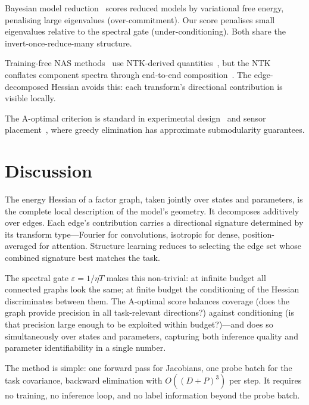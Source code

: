 \documentclass[11pt, a4paper]{article}
\begin{document}
Bayesian model reduction~\citep{friston2018bmr,friston2016group} scores reduced models by variational free energy, penalising large eigenvalues (over-commitment).
Our score penalises small eigenvalues relative to the spectral gate (under-conditioning).
Both share the invert-once-reduce-many structure.

Training-free NAS methods~\citep{chen2021tenas,shu2022nasi} use NTK-derived quantities~\citep{jacot2018neural}, but the NTK conflates component spectra through end-to-end composition~\citep{mok2022demystifying,zhou2024vintk}.
The edge-decomposed Hessian avoids this: each transform's directional contribution is visible locally.

The A-optimal criterion is standard in experimental design~\citep{pukelsheim2006optimal} and sensor placement~\citep{krause2008near}, where greedy elimination has approximate submodularity guarantees.

\section{Discussion}

The energy Hessian of a factor graph, taken jointly over states and parameters, is the complete local description of the model's geometry.
It decomposes additively over edges.
Each edge's contribution carries a directional signature determined by its transform type---Fourier for convolutions, isotropic for dense, position-averaged for attention.
Structure learning reduces to selecting the edge set whose combined signature best matches the task.

The spectral gate $\varepsilon = 1/\eta T$ makes this non-trivial: at infinite budget all connected graphs look the same; at finite budget the conditioning of the Hessian discriminates between them.
The A-optimal score balances coverage (does the graph provide precision in all task-relevant directions?) against conditioning (is that precision large enough to be exploited within budget?)---and does so simultaneously over states and parameters, capturing both inference quality and parameter identifiability in a single number.

The method is simple: one forward pass for Jacobians, one probe batch for the task covariance, backward elimination with $O((D{+}P)^3)$ per step.
It requires no training, no inference loop, and no label information beyond the probe batch.
\end{document}
